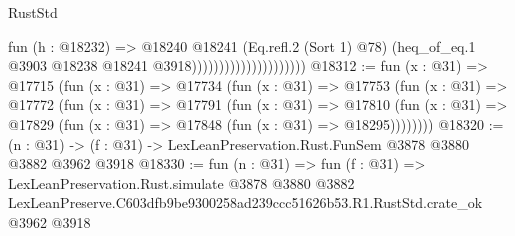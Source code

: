 \begin{lexlean}{RustStd}
\begin{coremodule}
                                          fun (h : @18232) =>
                                          @18240
                                            @18241
                                            (Eq.refl.{2} (Sort 1) @78)
                                            (heq_of_eq.{1}
                                              @3903
                                              @18238
                                              @18241
                                              @3918)))))))))))))))))))))
@18312 := fun (x : @31) =>
  @17715
    (fun (x : @31) =>
    @17734
      (fun (x : @31) =>
      @17753
        (fun (x : @31) =>
        @17772
          (fun (x : @31) =>
          @17791
            (fun (x : @31) =>
            @17810
              (fun (x : @31) => @17829 (fun (x : @31) => @17848 (fun (x : @31) => @18295))))))))
@18320 := (n : @31) -> (f : @31) -> LexLeanPreservation.Rust.FunSem @3878 @3880 @3882 @3962 @3918
@18330 := fun (n : @31) =>
  fun (f : @31) =>
  LexLeanPreservation.Rust.simulate
    @3878
    @3880
    @3882
    LexLeanPreserve.C603dfb9be9300258ad239ccc51626b53.R1.RustStd.crate_ok
    @3962
    @3918
\end{coremodule}
\end{lexlean}
